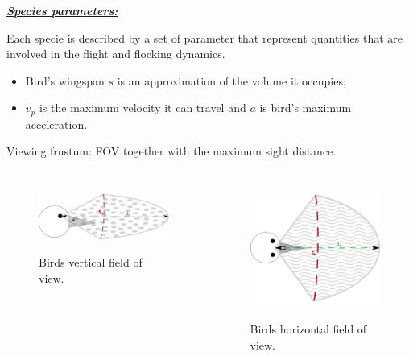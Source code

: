 \documentclass{beamer}
\begin{document}
\begin{frame}
\underline{\textbf{\textit{Species parameters: }}}

Each specie is described by a set of parameter that represent
quantities that are involved in the flight and flocking dynamics.
\begin{itemize}
\item Bird's wingspan $s$ is  an approximation of the
volume it occupies;
\item $v_p$ is the maximum velocity it can travel
and $a$ is bird's maximum acceleration.
\end{itemize}
Viewing frustum: FOV together with the maximum sight distance.
\begin{center}
\begin{columns}
\begin{figure}[h!]
		\includegraphics[scale=0.23]{images/verticalFow}
		\label{fig:vFOV}
		\caption{Birds vertical field of view. }
\end{figure}	

\begin{figure}[h]
\centering
\includegraphics[scale=0.17]{images/hFow}
	\label{fig:hFOV}
	\caption{Birds horizontal field of view. }
\end{figure}
\end{columns}
\end{center}
\end{frame}
\end{document}
